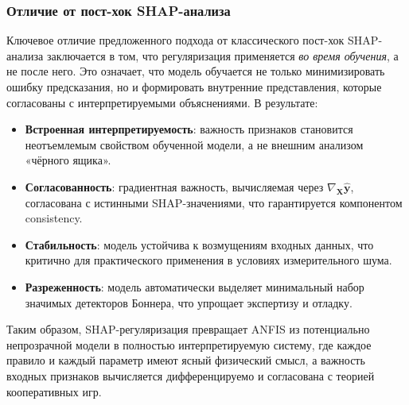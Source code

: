 \subsubsection{Отличие от пост-хок SHAP-анализа}

Ключевое отличие предложенного подхода от классического пост-хок SHAP-анализа заключается в том, что регуляризация применяется \textit{во время обучения}, а не после него. Это означает, что модель обучается не только минимизировать ошибку предсказания, но и формировать внутренние представления, которые согласованы с интерпретируемыми объяснениями. В результате:

\begin{itemize}
    \item \textbf{Встроенная интерпретируемость}: важность признаков становится неотъемлемым свойством обученной модели, а не внешним анализом «чёрного ящика».
    \item \textbf{Согласованность}: градиентная важность, вычисляемая через $\nabla_{\mathbf{X}} \hat{\mathbf{y}}$, согласована с истинными SHAP-значениями, что гарантируется компонентом consistency.
    \item \textbf{Стабильность}: модель устойчива к возмущениям входных данных, что критично для практического применения в условиях измерительного шума.
    \item \textbf{Разреженность}: модель автоматически выделяет минимальный набор значимых детекторов Боннера, что упрощает экспертизу и отладку.
\end{itemize}

Таким образом, SHAP-регуляризация превращает ANFIS из потенциально непрозрачной модели в полностью интерпретируемую систему, где каждое правило и каждый параметр имеют ясный физический смысл, а важность входных признаков вычисляется дифференцируемо и согласована с теорией кооперативных игр.
